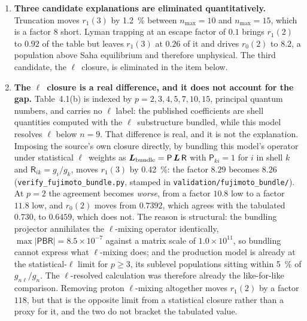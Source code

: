 \begin{enumerate}
\item \textbf{Three candidate explanations are eliminated quantitatively.}
Truncation moves $r_1(3)$ by \SI{1.2}{\percent} between $n_{\max}=10$ and
$n_{\max}=15$, which is a factor $8$ short. Lyman trapping at an escape factor
of $0.1$ brings $r_1(2)$ to $0.92$ of the table but leaves $r_1(3)$ at $0.26$ of
it and drives $r_0(2)$ to $8.2$, a population above Saha equilibrium and
therefore unphysical. The third candidate, the $\ell$~closure, is eliminated in
the item below.

\item \textbf{The $\ell$~closure is a real difference, and it does not account
for the gap.} Table~4.1(b) is indexed by $p = 2, 3, 4, 5, 7, 10, 15$, principal
quantum numbers, and carries no $\ell$ label: the published coefficients are
shell quantities computed with the $\ell$~substructure bundled, while this model
resolves $\ell$ below $n=9$. That difference is real, and it is not the
explanation. Imposing the source's own
closure directly, by bundling this model's operator under statistical
$\ell$~weights as $\bm{L}_{\rm bundle} = \mathsf{P}\,\bm{L}\,\mathsf{R}$ with
$\mathsf{P}_{ki} = 1$ for $i$ in shell $k$ and $\mathsf{R}_{ik} = g_i/g_k$,
moves $r_1(3)$ by \SI{0.42}{\percent}: the factor $8.29$ becomes $8.26$
(\texttt{verify\_fujimoto\_bundle.py}, stamped in
\texttt{validation/fujimoto\_bundle/}). At
$p=2$ the agreement becomes \emph{worse}, from a factor $10.8$ low to a factor
$11.8$ low, and $r_0(2)$ moves from $0.7392$, which agrees with the tabulated
$0.730$, to $0.6459$, which does not. The reason is structural: the bundling
projector annihilates the $\ell$-mixing operator identically, $\max|\mathsf{P}
\mathsf{B} \mathsf{R}| = 8.5\times10^{-7}$ against a matrix scale of
$1.0\times10^{11}$, so bundling cannot express what $\ell$-mixing does; and the
production model is already at the statistical-$\ell$ limit for $p \ge 3$, its
sublevel populations sitting within \SI{5}{\percent} of $g_{n\ell}/g_n$. The
$\ell$-resolved calculation was therefore already the like-for-like comparison.
Removing proton $\ell$-mixing altogether moves $r_1(2)$ by a factor $118$, but
that is the opposite limit from a statistical closure rather than a proxy for
it, and the two do not bracket the tabulated value.


\end{enumerate}
